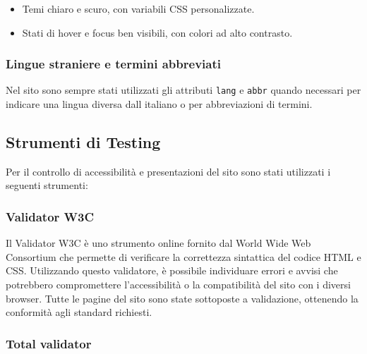 \begin{itemize}
  \item Temi chiaro e scuro, con variabili CSS personalizzate.
  \item Stati di hover e focus ben visibili, con colori ad alto contrasto.
\end{itemize}

\subsubsection{Lingue straniere e termini abbreviati}

Nel sito sono sempre stati utilizzati gli attributi \texttt{lang} e \texttt{abbr} quando necessari per indicare una lingua diversa dall italiano o per abbreviazioni di termini.

\subsection{Strumenti di Testing}

Per il controllo di accessibilità e presentazioni del sito sono stati utilizzati i seguenti strumenti:

\subsubsection{Validator W3C}

Il Validator W3C è uno strumento online fornito dal World Wide Web Consortium che permette di verificare la correttezza sintattica del codice HTML e CSS. Utilizzando questo validatore, è possibile individuare errori e avvisi che potrebbero compromettere l’accessibilità o la compatibilità del sito con i diversi browser. Tutte le pagine del sito sono state sottoposte a validazione, ottenendo la conformità agli standard richiesti.

\subsubsection{Total validator}

